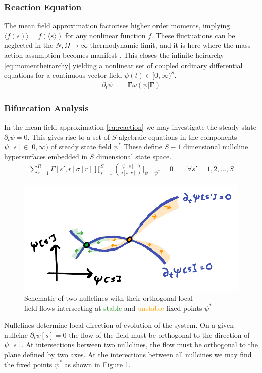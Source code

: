 \documentclass{article}[12pt]
\numberwithin{equation}{section}
\begin{document}
\subsubsection{Reaction Equation}\vspace{-10pt}
The mean field approximation factorises higher order moments, implying
$\big\langle f(s) \big\rangle=f(\langle s\rangle)$ for any nonlinear
function $f$. These fluctuations can be neglected in the $N,\Omega\rightarrow\infty$
thermodynamic limit, and it is here where the mass-action assumption
becomes manifest \cite{Gillespie2007}. This closes the infinite heirarchy
\eqref{eq:momentheirarchy} yielding a nonlinear set of coupled ordinary
differential equations for a continuous vector field $\psi(t)\in[0,\infty)^S$.\begin{align}
	\partial_t
	\psi &=
	\mathbf{\Gamma}\omega(\psi|\mathbf{\Gamma})
	\label{eq:reaction}
\end{align}
\subsubsection{Bifurcation Analysis}\vspace{-15pt}
In the mean field approximation \eqref{eq:reaction} we may investigate the
steady state $\partial_t\psi=0$. This gives rise to a set of $S$ algebraic
equations in the components $\psi[s]\in[0,\infty)$ of steady state field $\psi^*$
These define $S-1$ dimensional nullcline hypersurfaces embedded in $S$
dimensional state space.
\begin{align}
	\sum_{r=1}^R\Gamma[s',r]\sigma[r]
		\prod_{s=1}^S{\psi[s] \choose g[s,r]}
		\bigg|_{\psi=\psi^*}
		=0\qquad\forall s'=1,2,\dots,S
	\label{eq:steadystate}
\end{align}
\begin{figure}[H]
\centering{}
\captionsetup{justification=centering}
\includegraphics[scale=0.35]{figures/nullclines}
\caption{Schematic of two nullclines with their orthogonal local\\ field flows intersecting
at \textcolor{Green}{stable} and \textcolor{orange}{unstable} fixed points $\psi^*$}
\label{fig:nullclines}
\end{figure}
Nullclines determine local direction of evolution of the system. On a given
nullcine $\partial_t\psi[s]=0$ the flow of the field must be orthogonal to
the direction of $\psi[s]$. At intersections between two nullclines, the flow
must be orthogonal to the plane defined by two axes. At the interections between
all nullcines we may find the fixed points $\psi^*$ as shown in Figure \ref{fig:nullclines}.
\end{document}
